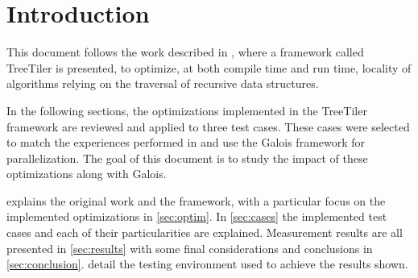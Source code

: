 \section{Introduction}
\label{sec:intro}

This document follows the work described in \cite{tree_tiler}, where a framework called TreeTiler is presented, to optimize, at both compile time and run time, locality of algorithms relying on the traversal of recursive data structures.

In the following sections, the optimizations implemented in the TreeTiler framework are reviewed and applied to three test cases. These cases were selected to match the experiences performed in \cite{tree_tiler} and use the Galois framework\cite{galois} for parallelization. The goal of this document is to study the impact of these optimizations along with Galois.

 explains the original work and the \treetiler framework, with a particular focus on the implemented optimizations in \cref{sec:optim}. In \cref{sec:cases} the implemented test cases and each of their particularities are explained. Measurement results are all presented in \cref{sec:results} with some final considerations and conclusions in \cref{sec:conclusion}.  detail the testing environment used to achieve the results shown.